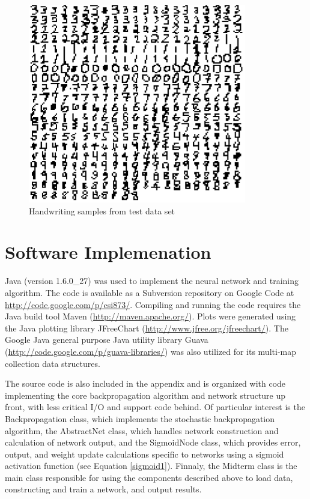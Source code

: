\documentclass{article}
\begin{document}
\begin{figure}
\centering
\includegraphics[width=0.85\textwidth]{data/visualization/all_testing_data.png}
\caption{Handwriting samples from test data set}
\label{test_all}
\end{figure}

\section{Software Implemenation}\label{Software Implemenation}

Java (version 1.6.0\_27) was used to implement the neural network and training algorithm. The code is available as a Subversion repository on Google Code at \url{http://code.google.com/p/csi873/}. Compiling and running the code requires the Java build tool Maven (\url{http://maven.apache.org/}). Plots were generated using the Java plotting library JFreeChart (\url{http://www.jfree.org/jfreechart/}). The Google Java general purpose Java utility library Guava (\url{http://code.google.com/p/guava-libraries/}) was also utilized for its multi-map collection data structures.

The source code is also included in the appendix and is organized with code implementing the core backpropagation algorithm and network structure up front, with less critical I/O and support code behind. Of particular interest is the Backpropagation class, which implements the stochastic backpropagation algorithm, the AbstractNet class, which handles network construction and calculation of network output, and the SigmoidNode class, which provides error, output, and weight update calculations specific to networks using a sigmoid activation function (see Equation \ref{sigmoid1}). Finnaly, the Midterm class is the main class responsible for using the components described above to load data, constructing and train a network, and output results.
\end{document}
